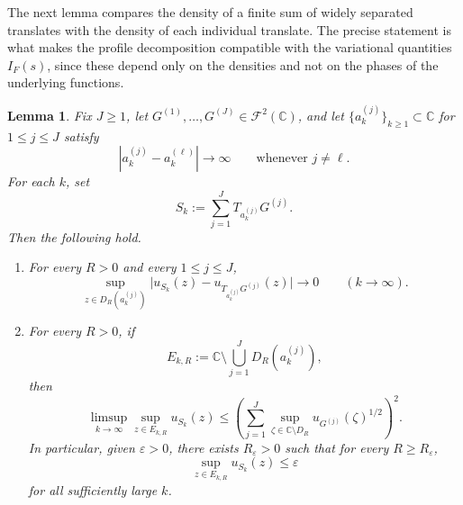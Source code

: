 \documentclass[a4paper,11pt,reqno]{amsart}
\numberwithin{equation}{section}
\theoremstyle{plain} %
\newtheorem{lemma}{Lemma}[section]
\theoremstyle{definition} %
\theoremstyle{remark}
\newcommand{\C}{\mathbb{C}}
\begin{document}
The next lemma compares the density of a finite sum of widely separated
translates with the density of each individual translate. The precise statement
is what makes the profile decomposition compatible with the variational
quantities \(I_F(s)\), since these depend only on the densities and not on
the phases of the underlying functions.

\begin{lemma}\label{lem:pointwise-decoupling-global}
Fix \(J\ge 1\), let \(G^{(1)},\dots,G^{(J)}\in \mathcal F^2(\C)\), and let
\(\{a_k^{(j)}\}_{k\ge 1}\subset \C\) for \(1\le j\le J\) satisfy
\[
|a_k^{(j)}-a_k^{(\ell)}|\to\infty
\qquad\text{whenever }j\neq \ell.
\]
For each \(k\), set
\[
S_k:=\sum_{j=1}^J T_{a_k^{(j)}}G^{(j)}.
\]
Then the following hold.
\begin{enumerate}
\item[(i)] For every \(R>0\) and every \(1\le j\le J\),
\[
\sup_{z\in D_R(a_k^{(j)})}
\big|u_{S_k}(z)-u_{T_{a_k^{(j)}}G^{(j)}}(z)\big|
\to 0
\qquad (k\to\infty).
\]

\item[(ii)] For every \(R>0\), if
\[
E_{k,R}:=\C\setminus \bigcup_{j=1}^J D_R(a_k^{(j)}),
\]
then
\[
\limsup_{k\to\infty}\sup_{z\in E_{k,R}}u_{S_k}(z)
\le
\left(
\sum_{j=1}^J
\sup_{\zeta\in \C\setminus D_R} u_{G^{(j)}}(\zeta)^{1/2}
\right)^2.
\]
In particular, given \(\varepsilon>0\), there exists \(R_\varepsilon>0\) such that
for every \(R\ge R_\varepsilon\),
\[
\sup_{z\in E_{k,R}}u_{S_k}(z)\le \varepsilon
\]
for all sufficiently large \(k\).
\end{enumerate}
\end{lemma}
\end{document}
